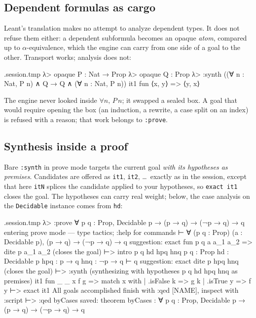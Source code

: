 \documentclass[11pt,oneside]{article}
\newcommand{\code}[1]{\texttt{#1}}
\newenvironment{session}
 {\VerbatimEnvironment\begin{VerbatimOut}{\jobname.session.tmp}}
 {\end{VerbatimOut}%
  \begin{sessionouter}%
  \VerbatimInput[fontsize=\footnotesize, breaklines=true,
    breaksymbolleft={\textcolor{stone}{\footnotesize$\hookrightarrow$}},
    formatcom=\color{ink}, tabsize=4]{\jobname.session.tmp}%
  \end{sessionouter}}
\begin{document}
\subsection{Dependent formulas as cargo}\label{sec:dependent}

Leant's translation makes no attempt to analyze dependent types.
It does not refuse them either: a dependent subformula becomes an
opaque \emph{atom}, compared up to $\alpha$-equivalence, which the
engine can carry from one side of a goal to the other. Transport
works; analysis does not:

\begin{session}
λ> opaque P : Nat → Prop
λ> opaque Q : Prop
λ> :synth ((∀ n : Nat, P n) ∧ Q → Q ∧ (∀ n : Nat, P n))
  it1  fun ⟨x, y⟩ => ⟨y, x⟩
\end{session}

The engine never looked inside $\forall n,\, P\,n$; it swapped a
sealed box. A goal that would require opening the box (an induction, a
rewrite, a case split on an index) is refused with a reason; that work
belongs to \code{:prove}.

\subsection{Synthesis inside a proof}\label{sec:synthprove}

Bare \code{:synth} in prove mode targets the current goal \emph{with
its hypotheses as premises}. Candidates are offered as \code{it1},
\code{it2}, \dots\ exactly as in the session, except that here
\code{itN} splices the candidate applied to your hypotheses, so
\code{exact it1} closes the goal. The hypotheses can carry real
weight; below, the case analysis on the \code{Decidable} instance
comes from \code{hd}:

\begin{session}
λ> :prove ∀ p q : Prop, Decidable p → (p → q) → (¬p → q) → q
entering prove mode — type tactics; :help for commands
⊢ ∀ (p q : Prop) (a : Decidable p), (p → q) → (¬p → q) → q
suggestion: exact fun p q a a_1 a_2 => dite p a_1 a_2  (closes the goal)
⊢> intro p q hd hpq hnq
p q : Prop
hd : Decidable p
hpq : p → q
hnq : ¬p → q
⊢ q
suggestion: exact dite p hpq hnq  (closes the goal)
⊢> :synth
(synthesizing with hypotheses p q hd hpq hnq as premises)
  it1  fun _ _ x f g => match x with | .isFalse k => g k | .isTrue y => f y
⊢> exact it1
All goals accomplished
finish with :qed [NAME], inspect with :script
⊢> :qed byCases
saved: theorem byCases : ∀ p q : Prop, Decidable p → (p → q) → (¬p → q) → q
\end{session}
\end{document}
